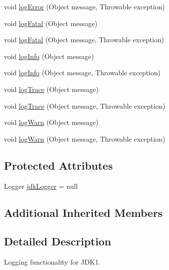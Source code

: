 \begin{DoxyCompactItemize}
\item 
void \mbox{\hyperlink{classcom_1_1mysql_1_1cj_1_1log_1_1_jdk14_logger_ada15522843be28970a27cfb2892147d0}{log\+Error}} (Object message, Throwable exception)
\item 
void \mbox{\hyperlink{classcom_1_1mysql_1_1cj_1_1log_1_1_jdk14_logger_a6f21dd8deaa592dba6d0dcdca158ad8e}{log\+Fatal}} (Object message)
\item 
void \mbox{\hyperlink{classcom_1_1mysql_1_1cj_1_1log_1_1_jdk14_logger_a63cb086965547119c85338b7238594b9}{log\+Fatal}} (Object message, Throwable exception)
\item 
void \mbox{\hyperlink{classcom_1_1mysql_1_1cj_1_1log_1_1_jdk14_logger_afb7e72826582a918eb3ec8b14549a7d0}{log\+Info}} (Object message)
\item 
void \mbox{\hyperlink{classcom_1_1mysql_1_1cj_1_1log_1_1_jdk14_logger_a439d3b7c7b21fd3f766bed9729e77551}{log\+Info}} (Object message, Throwable exception)
\item 
void \mbox{\hyperlink{classcom_1_1mysql_1_1cj_1_1log_1_1_jdk14_logger_a31e22a245c6b07299ada95de3858d960}{log\+Trace}} (Object message)
\item 
void \mbox{\hyperlink{classcom_1_1mysql_1_1cj_1_1log_1_1_jdk14_logger_a294191637fa5aadb2991b412b1fadde8}{log\+Trace}} (Object message, Throwable exception)
\item 
void \mbox{\hyperlink{classcom_1_1mysql_1_1cj_1_1log_1_1_jdk14_logger_ae7bb8949ce0f06e610b7c2f285432ffd}{log\+Warn}} (Object message)
\item 
void \mbox{\hyperlink{classcom_1_1mysql_1_1cj_1_1log_1_1_jdk14_logger_ae61cfdb92166273f90bec4fbbac6374c}{log\+Warn}} (Object message, Throwable exception)
\end{DoxyCompactItemize}
\subsection*{Protected Attributes}
\begin{DoxyCompactItemize}
\item 
Logger \mbox{\hyperlink{classcom_1_1mysql_1_1cj_1_1log_1_1_jdk14_logger_a204d9cc5608810f28a924d65f8583f5f}{jdk\+Logger}} = null
\end{DoxyCompactItemize}
\subsection*{Additional Inherited Members}


\subsection{Detailed Description}
Logging functionality for J\+D\+K1. 

